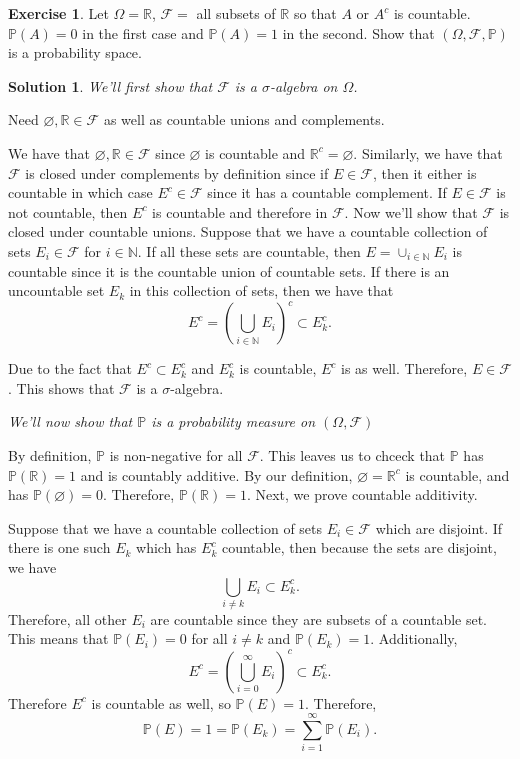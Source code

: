 \documentclass[12pt]{article}
\newcommand{\bbN}{\mathbb{N}}
\newcommand{\bbR}{\mathbb{R}}
\newcommand{\Prob}{\mathbb{P}}
\newcommand{\calF}{\mathcal{F}}
\theoremstyle{definition}
\newtheorem{exer}{Exercise}
\newtheorem{sol}{Solution}
\theoremstyle{remark}
\begin{document}
\newpage
\begin{exer}
Let $\Omega=\mathbb{R}$, $\mathcal{F}=$ all subsets of $\mathbb{R}$ so that $A$ or $A^c$ is countable. $\Prob(A)=0$ in the first case and $\Prob(A)=1$ in the second. Show that $(\Omega, \mathcal{F}, \Prob)$ is a probability space.
\end{exer}
\begin{sol}
\emph{We'll first show that $\calF$ is a $\sigma$-algebra on $\Omega$.}

Need $\varnothing,\bbR \in\calF$ as well as countable unions and complements. 

We have that $\varnothing, \bbR \in \calF$ since $\varnothing$ is countable and $\bbR^c = \varnothing$. Similarly, we have that $\calF$ is closed under complements by definition since if $E \in \calF$, then it either is countable in which case $E^c \in \calF$ since it has a countable complement. If $E\in \calF$ is not countable, then $E^c$ is countable and therefore in $\calF$. Now we'll show that $\calF$ is closed under countable unions. Suppose that we have a countable collection of sets $E_i \in \calF$ for $i\in\bbN$. If all these sets are countable, then $E = \cup_{i\in\bbN} E_i$ is countable since it is the countable union of countable sets. If there is an uncountable set $E_k$ in this collection of sets, then we have that 
\begin{equation}
    E^c = \left( \bigcup_{i\in\bbN} E_i \right)^c \subset E_k^c.
\end{equation}

Due to the fact that $E^c \subset E_k^c$ and $E_k^c$ is countable, $E^c$ is as well. Therefore, $E\in\calF$. This shows that $\calF$ is a $\sigma$-algebra.

\emph{We'll now show that $\Prob$ is a probability measure on $(\Omega, \calF)$}

By definition, $\Prob$ is non-negative for all $\calF$. This leaves us to chceck that $\Prob$ has $\Prob(\bbR) = 1$ and is countably additive. By our definition, $\varnothing = \bbR^c$ is countable, and has $\Prob(\varnothing) = 0$. Therefore, $\Prob(\bbR) = 1$. Next, we prove countable additivity.

Suppose that we have a countable collection of sets $E_i \in \calF$ which are disjoint. If there is one such $E_k$ which has $E_k^c$ countable, then because the sets are disjoint, we have 
\begin{equation}
\bigcup_{i\neq k} E_i \subset E_k^c.
\end{equation}
Therefore, all other $E_i$ are countable since they are subsets of a countable set. This means that $\Prob(E_i) = 0$ for all $i\neq k$ and $\Prob(E_k) = 1$. Additionally, 
\begin{equation}
    E^c = \left(  \bigcup_{i = 0}^\infty E_i \right)^c \subset E_k^c. 
    \end{equation} Therefore $E^c$ is countable as well, so $\Prob(E) = 1$. Therefore, 
\begin{equation}
    \Prob(E) = 1 = \Prob(E_k) = \sum_{i = 1}^\infty \Prob(E_i).
\end{equation}


\end{sol}
\end{document}
